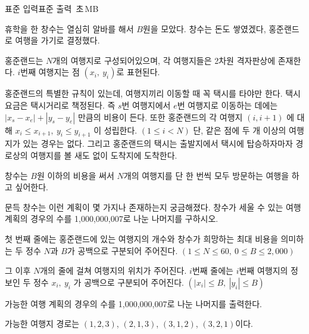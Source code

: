 \begin{problem}{\kcpctourtitle}
    {표준 입력}{표준 출력}
    {\kcpctourtime\,초}{\kcpctourmemory\,MB}{}{\kcpctourscore}
    
    휴학을 한 창수는 열심히 알바를 해서 $ B $원을 모았다. 창수는 돈도 쌓였겠다, 홍준랜드로 여행을 가기로 결정했다.
    
    홍준랜드는 $ N $개의 여행지로 구성되어있으며, 각 여행지들은 2차원 격자판상에 존재한다. $ i $번째 여행지는 점 $ (x_i,\ y_i) $로 표현된다.
    
    홍준랜드의 특별한 규칙이 있는데, 여행지끼리 이동할 때 꼭 택시를 타야만 한다. 택시요금은 택시거리로 책정된다. 즉 $ s $번 여행지에서 $ e $번 여행지로 이동하는 데에는 $ |x_s - x_e| + |y_s - y_e| $ 만큼의 비용이 든다. 또한 홍준랜드의 각 여행지 $ (i, i+1) $ 에 대해 $ x_i \leq x_{i+1},\ y_i \leq y_{i+1} $ 이 성립한다. $ (1 \leq i < N) $ 단, 같은 점에 두 개 이상의 여행지가 있는 경우는 없다. 그리고 홍준랜드의 택시는 출발지에서 택시에 탑승하자마자 경로상의 여행지를 볼 새도 없이 도착지에 도착한다.
    
    창수는 $ B $원 이하의 비용을 써서 $ N $개의 여행지를 단 한 번씩 모두 방문하는 여행을 하고 싶어한다.
    
    문득 창수는 이런 계획이 몇 가지나 존재하는지 궁금해졌다. 창수가 세울 수 있는 여행계획의 경우의 수를 1,000,000,007로 나눈 나머지를 구하시오.
    
    
    \InputFile
    첫 번째 줄에는 홍준랜드에 있는 여행지의 개수와 창수가 희망하는 최대 비용을 의미하는 두 정수 $ N $과 $ B $가 공백으로 구분되어 주어진다. $ (1 \leq N \leq 60,\ 0 \leq B \leq 2,000) $
    
    그 이후 $ N $개의 줄에 걸쳐 여행지의 위치가 주어진다. $ i $번째 줄에는 $ i $번째 여행지의 정보인 두 정수 $ x_i,\ y_i $ 가 공백으로 구분되어 주어진다. $ (|x_i| \leq B,\ |y_i| \leq B) $
    
    \OutputFile
    가능한 여행 계획의 경우의 수를 1,000,000,007로 나눈 나머지를 출력한다.

    \Examples
    
    \begin{example}
    \end{example}
    
    가능한 여행지 경로는 $ (1,2,3) $, $ (2,1,3) $, $ (3,1,2) $, $ (3,2,1) $이다.
    
\end{problem}

